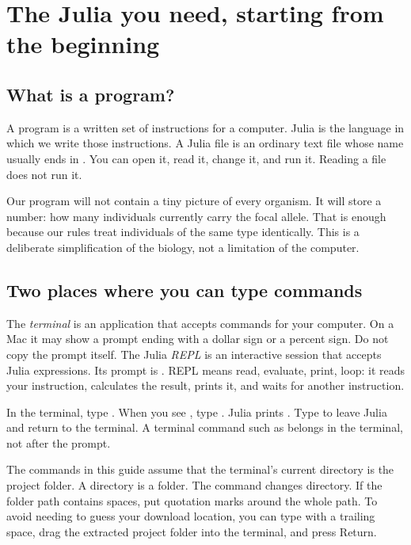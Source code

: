 \chapter{The Julia you need, starting from the beginning}
\label{chap:julia}

\section{What is a program?}
A program is a written set of instructions for a computer. Julia is the language in which we write those instructions. A Julia file is an ordinary text file whose name usually ends in . You can open it, read it, change it, and run it. Reading a file does not run it.

Our program will not contain a tiny picture of every organism. It will store a number: how many individuals currently carry the focal allele. That is enough because our rules treat individuals of the same type identically. This is a deliberate simplification of the biology, not a limitation of the computer.

\section{Two places where you can type commands}
The \emph{terminal} is an application that accepts commands for your computer. On a Mac it may show a prompt ending with a dollar sign or a percent sign. Do not copy the prompt itself. The Julia \emph{REPL} is an interactive session that accepts Julia expressions. Its prompt is . REPL means read, evaluate, print, loop: it reads your instruction, calculates the result, prints it, and waits for another instruction.

\begin{workedexample}
In the terminal, type . When you see , type . Julia prints . Type  to leave Julia and return to the terminal. A terminal command such as  belongs in the terminal, not after the  prompt.
\end{workedexample}

The commands in this guide assume that the terminal's current directory is the project folder. A directory is a folder. The  command changes directory. If the folder path contains spaces, put quotation marks around the whole path. To avoid needing to guess your download location, you can type  with a trailing space, drag the extracted project folder into the terminal, and press Return.

